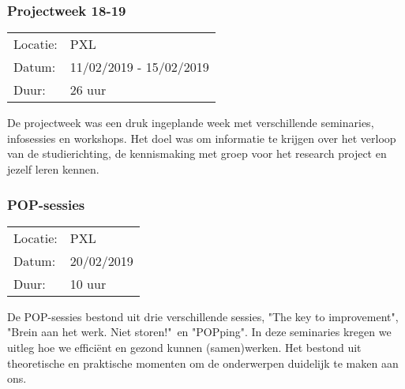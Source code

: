 \subsubsection{Projectweek 18-19}

\begin{tabular}{l l}
  Locatie: & PXL\\
  Datum: & 11/02/2019 - 15/02/2019\\
  Duur: & 26 uur
\end{tabular}

De projectweek was een druk ingeplande week met verschillende seminaries, infosessies en workshops. Het doel was om informatie te krijgen over het verloop van de studierichting, de kennismaking met groep voor het research project en jezelf leren kennen.

\subsubsection{POP\hyp{}sessies}

\begin{tabular}{l l}
  Locatie: & PXL\\
  Datum: & 20/02/2019\\
  Duur: & 10 uur
\end{tabular}

De POP\hyp{}sessies bestond uit drie verschillende sessies, "The key to improvement", "Brein aan het werk. Niet storen!"\ en "POPping". In deze seminaries kregen we uitleg hoe we effici\"ent en gezond kunnen (samen)werken. Het bestond uit theoretische en praktische momenten om de onderwerpen duidelijk te maken aan ons.